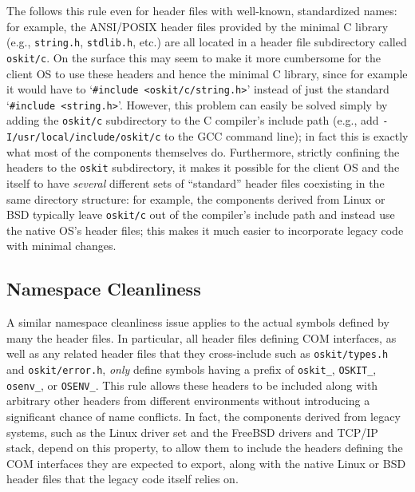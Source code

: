 The \oskit{} follows this rule
even for header files with well-known, standardized names:
for example, the ANSI/POSIX header files provided by the minimal C library
(e.g., \texttt{string.h}, \texttt{stdlib.h}, etc.)
are all located in a header file subdirectory called \texttt{oskit/c}.
On the surface this may seem to make it more cumbersome
for the client OS to use these headers and hence the minimal C library,
since for example it would have to `{\tt \#include <oskit/c/string.h>}'
instead of just the standard `{\tt \#include <string.h>}'.
However, this problem can easily be solved
simply by adding the \texttt{oskit/c} subdirectory
to the C compiler's include path
(e.g., add \texttt{-I/usr/local/include/oskit/c} to the GCC command line);
in fact this is exactly what most of the \oskit{} components themselves do.
Furthermore,
strictly confining the \oskit{} headers to the \texttt{oskit} subdirectory,
it makes it possible for the client OS and the \oskit{} itself
to have \emph{several} different sets of ``standard'' header files
coexisting in the same directory structure:
for example, the \oskit{} components derived from Linux or BSD
typically leave \texttt{oskit/c} out of the compiler's include path
and instead use the native OS's header files;
this makes it much easier to incorporate legacy code with minimal changes.

\subsection{Namespace Cleanliness}

A similar namespace cleanliness issue
applies to the actual symbols defined by many the \oskit{} header files.
In particular, all \oskit{} header files defining COM interfaces,
as well as any related header files that they cross-include
such as \texttt{oskit/types.h} and \texttt{oskit/error.h},
\emph{only} define symbols having a prefix of
\texttt{oskit_}, \texttt{OSKIT_}, \texttt{osenv_}, or \texttt{OSENV_}.
This rule allows these headers to be included
along with arbitrary other headers from different environments
without introducing a significant chance of name conflicts.
In fact, the \oskit{} components derived from legacy systems,
such as the Linux driver set and the FreeBSD drivers and TCP/IP stack,
depend on this property,
to allow them to include the \oskit{} headers
defining the COM interfaces they are expected to export,
along with the native Linux or BSD header files
that the legacy code itself relies on.

